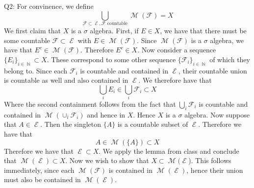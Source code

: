 \documentclass[letterpaper]{article}
\DeclareMathOperator{\E}{\mathcal{E}}
\DeclareMathOperator{\M}{\mathcal{M}}
\DeclareMathOperator{\N}{\mathbb{N}}
\begin{document}
\noindent
Q2: For convinence, we define $$\bigcup _{\mathcal{F} \subset \E , \mathcal{F} \text{ countable}} \M(\mathcal{F}) = X$$ We first claim that $X$ is a $\sigma$ algebra. First, if $E\in X$, we have that there must be some countable $\mathcal{F}\subset \E$ with $E\in \M(\mathcal{F})$. Since $\M(\mathcal{F})$ is a $\sigma$ algebra, we have that $E^c\in \M(\mathcal{F})$. Therefore $E^c\in X$. Now consider a sequence $\{E_i\}_{i\in \N}\subset X$. These correspond to some other sequence $\{\mathcal{F}_{i}\}_{i\in \N}$ of which they belong to. Since each $\mathcal{F}_i$ is countable and contained in $\E$, their countable union is countable as well and also contained in $\E$. We therefore have that $$\bigcup_{i} E_i \in \bigcup_{i}\mathcal{F}_i \subset X$$ Where the second containment follows from the fact that $\bigcup_{i}\mathcal{F}_i$ is countable and contained in $\M(\cup_{i} \mathcal{F}_i)$ and hence in $X$. Hence $X$ is a $\sigma$ algebra. Now suppose that $A\in \E$. Then the singleton $\{A\}$ is a countable subset of $\E$. Therefore we have that $$A\in \M(\{A\}) \subset X$$  
Therefore we have that $\E \subset X$. We apply the lemma from class and conclude that $\M(\E)\subset X$. Now we wish to show that $X \subset  \M(\E$). This follows immediately, since each $\M(\mathcal{F})$ is contained in $\M(\E)$, hence their union must also be contained in $\M(\E)$. 
\end{document}
